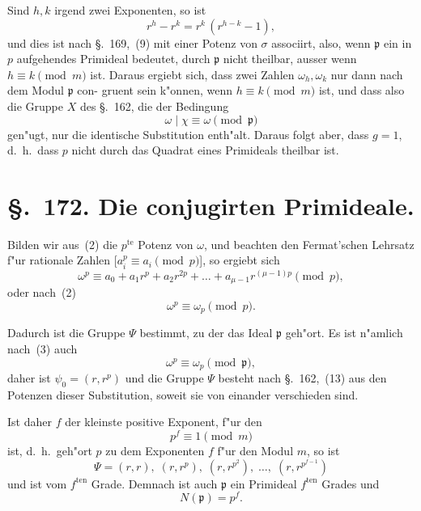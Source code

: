 \documentclass[12pt,a4paper]{article}
\theoremstyle{weber}
\begin{document}
Sind $h, k$ irgend zwei Exponenten, so ist
\[
r^h - r^k = r^k\,(r^{h-k} - 1),
\]
und dies ist nach \S.~169,~(9) mit einer Potenz von $\sigma$ associirt,
also, wenn $\mathfrak{p}$ ein in $p$ aufgehendes Primideal bedeutet, durch $\mathfrak{p}$
nicht theilbar, ausser wenn $h \equiv k \pmod{m}$ ist. Daraus ergiebt
sich, dass zwei Zahlen $\omega_h, \omega_k$ nur dann nach dem Modul $\mathfrak{p}$ con-
gruent sein k"onnen, wenn $h \equiv k \pmod{m}$ ist, und dass also die
Gruppe $X$ des \S.~162, die der Bedingung
\[
\omega \mid \chi \equiv \omega \pmod{\mathfrak{p}}
\]
gen"ugt, nur die identische Substitution enth"alt. Daraus folgt
aber, dass $g = 1$, d.~h.\ dass $p$ nicht durch das Quadrat
eines Primideals theilbar ist.

\newpage
\section*{\S.~172. Die conjugirten Primideale.}

Bilden wir aus~(2) die $p^{\mathrm{te}}$ Potenz von $\omega$, und beachten den
Fermat'schen Lehrsatz f"ur rationale Zahlen [$a_i^p \equiv a_i \pmod{p}$],
so ergiebt sich
\[
\omega^p \equiv a_0 + a_1r^p + a_2r^{2p} + \dots + a_{\mu-1}r^{(\mu-1)p} \pmod{p},
\]
oder nach~(2)
\begin{equation}\label{eq:s172-3}
\omega^p \equiv \omega_p \pmod{p}.
\end{equation}

Dadurch ist die Gruppe $\varPsi$ bestimmt, zu der das Ideal $\mathfrak{p}$
geh"ort. Es ist n"amlich nach~(3) auch
\[
\omega^p \equiv \omega_p \pmod{\mathfrak{p}},
\]
daher ist $\psi_0 = (r, r^p)$ und die Gruppe $\varPsi$ besteht nach \S.~162,~(13)
aus den Potenzen dieser Substitution, soweit sie von einander
verschieden sind.

Ist daher $f$ der kleinste positive Exponent, f"ur den
\begin{equation}\label{eq:s172-4}
p^f \equiv 1 \pmod{m}
\end{equation}
ist, d.~h.\ geh"ort $p$ zu dem Exponenten $f$ f"ur den Modul $m$, so ist
\begin{equation}\label{eq:s172-5}
\varPsi = (r, r),\; (r, r^p),\; (r, r^{p^2}),\; \dots,\; (r, r^{p^{f-1}})
\end{equation}
und ist vom $f^{\mathrm{ten}}$ Grade. Demnach ist auch $\mathfrak{p}$ ein Primideal
$f^{\mathrm{ten}}$ Grades und
\begin{equation}\label{eq:s172-6}
N(\mathfrak{p}) = p^f.
\end{equation}
\end{document}
